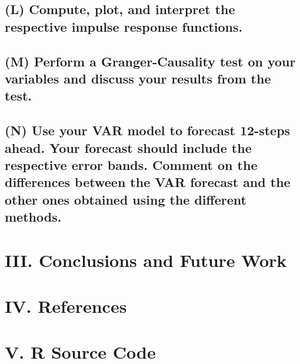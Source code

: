 \documentclass[
  10.5pt,
]{article}
\begin{document}
\hypertarget{l-compute-plot-and-interpret-the-respective-impulse-response-functions.}{%
\subsection{(L) Compute, plot, and interpret the respective impulse
response
functions.}\label{l-compute-plot-and-interpret-the-respective-impulse-response-functions.}}

\hypertarget{m-perform-a-granger-causality-test-on-your-variables-and-discuss-your-results-from-the-test.}{%
\subsection{(M) Perform a Granger-Causality test on your variables and
discuss your results from the
test.}\label{m-perform-a-granger-causality-test-on-your-variables-and-discuss-your-results-from-the-test.}}

\hypertarget{n-use-your-var-model-to-forecast-12-steps-ahead.-your-forecast-should-include-the-respective-error-bands.-comment-on-the-differences-between-the-var-forecast-and-the-other-ones-obtained-using-the-different-methods.}{%
\subsection{(N) Use your VAR model to forecast 12-steps ahead. Your
forecast should include the respective error bands. Comment on the
differences between the VAR forecast and the other ones obtained using
the different
methods.}\label{n-use-your-var-model-to-forecast-12-steps-ahead.-your-forecast-should-include-the-respective-error-bands.-comment-on-the-differences-between-the-var-forecast-and-the-other-ones-obtained-using-the-different-methods.}}

\newpage

\hypertarget{iii.-conclusions-and-future-work}{%
\section{III. Conclusions and Future
Work}\label{iii.-conclusions-and-future-work}}

\newpage

\hypertarget{iv.-references}{%
\section{IV. References}\label{iv.-references}}

\newpage

\hypertarget{v.-r-source-code}{%
\section{V. R Source Code}\label{v.-r-source-code}}
\end{document}
